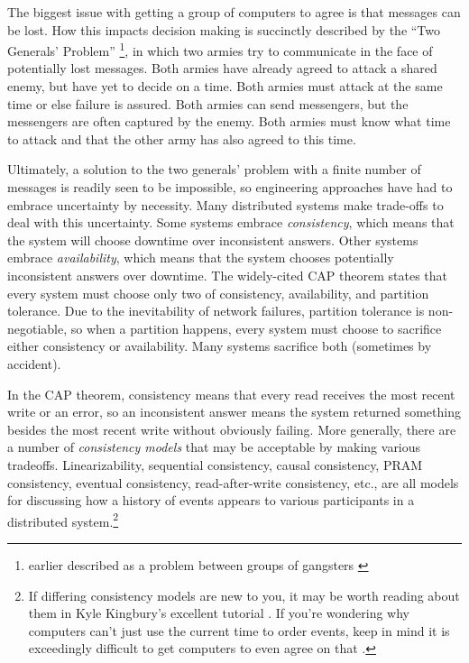 \documentclass[11pt,fleqn,openany]{book}
\begin{document}
The biggest issue with getting a group of computers to agree is that messages
can be lost. How this impacts decision making is succinctly described by the
``Two Generals' Problem'' \cite{two-generals}
\footnote{earlier described as a problem
between groups of gangsters \cite{two-gangsters}}, in which two armies try to
communicate in the face of potentially lost messages. Both armies have already
agreed to attack a shared enemy, but have yet to decide on a time. Both armies
must attack at the same time or else failure is assured. Both armies can send
messengers, but the messengers are often captured by the enemy. Both armies must
know what time to attack and that the other army has also agreed to this time.

Ultimately, a solution to the two generals' problem with a finite number of
messages is readily seen to be impossible, so engineering approaches have had
to embrace uncertainty by necessity. Many distributed systems make trade-offs to
deal with this uncertainty. Some systems embrace {\em consistency}, which means
that the system will choose downtime over inconsistent answers. Other
systems embrace {\em availability}, which means that the system chooses
potentially inconsistent answers over downtime. The widely-cited CAP
theorem \cite{cap1, cap2} states that every system must choose only two of
consistency, availability, and partition tolerance.
Due to the inevitability of network
failures, partition tolerance is non-negotiable, so when a partition happens,
every system must choose to sacrifice either consistency or availability. Many
systems sacrifice both (sometimes by accident).

In the CAP theorem, consistency means that every read receives the most recent
write or an error, so an inconsistent answer means the system returned something
besides the most recent write without obviously failing. More generally, there
are a number of {\em consistency models} that may be acceptable by making
various tradeoffs. Linearizability, sequential consistency, causal consistency,
PRAM consistency, eventual consistency, read-after-write consistency, etc., are
all models for discussing how a history of events appears to various
participants in a distributed system.\footnote{If differing consistency models
are new to you, it may be worth reading about them in Kyle Kingbury's excellent
tutorial \cite{aphyr-consistency}. If you're wondering why computers can't just
use the current time to order events, keep in mind it is exceedingly difficult
to get computers to even agree on that \cite{no-now}.}
\end{document}
